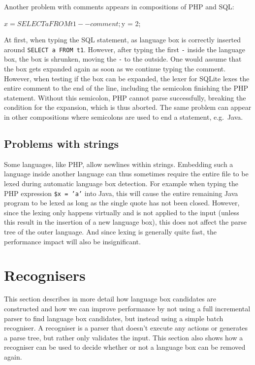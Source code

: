 \documentclass[sigplan,screen]{acmart}\settopmatter{printfolios=true,printccs=false,printacmref=false}
\begin{document}
Another problem with comments appears in compositions of PHP and SQL:

\begin{lstdefault}[language=PHP]
$x = SELECT a FROM t1 -- comment;
$y = 2;
\end{lstdefault}

At first, when typing the SQL statement, as language box is correctly inserted
around \verb|SELECT a FROM t1|. However, after typing the first \texttt{-}
inside the language box, the box is shrunken, moving the \texttt{-} to the
outside. One would assume that the box gets expanded again as soon as we
continue typing the comment. However, when testing if the box can be expanded,
the lexer for SQLite lexes the entire comment to the end of the line, including
the semicolon finishing the PHP statement. Without this semicolon, PHP cannot
parse successfully, breaking the condition for the expansion, which is thus
aborted. The same problem can appear in other compositions where semicolons are
used to end a statement, e.g.~Java.

\subsection{Problems with strings}

Some languages, like PHP, allow newlines within strings. Embedding such a
language inside another language can thus sometimes require the entire file to
be lexed during automatic language box detection. For example when typing the
PHP expression \texttt{\$x = 'a'} into Java, this will cause the entire
remaining Java program to be lexed as long as the single quote has not been
closed. However, since the lexing only happens virtually and is not applied to
the input (unless this result in the insertion of a new language box), this
does not affect the parse tree of the outer language. And since lexing is
generally quite fast, the performance impact will also be insignificant.

\section{Recognisers}
\label{sec:impl_defaultrec}

This section describes in more detail how language box candidates are
constructed and how we can improve performance by not using a full incremental
parser to find language box candidates, but instead using a simple batch
recogniser. A recogniser is a parser that doesn't execute any actions or
generates a parse tree, but rather only validates the input. This section also
shows how a recogniser can be used to decide whether or not a language box can
be removed again.
\end{document}
